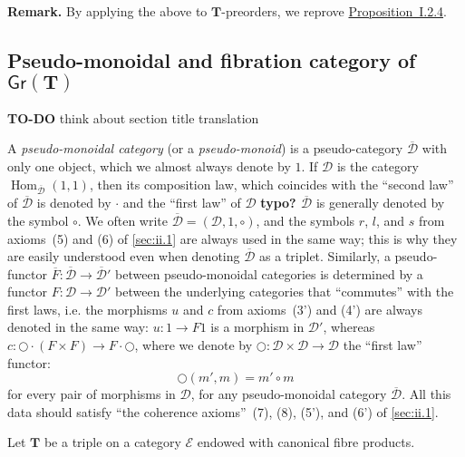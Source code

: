 \documentclass[fleqn]{article}
\newenvironment{rmenv}[1]
  {\phantomsection\par\medskip\noindent\textbf{#1.}\rmfamily}
  {\par\medskip}
\newcommand{\oldpage}[1]{\marginpar{\footnotesize$\Big\vert$ \textit{p.~#1}}}
\newcommand{\todo}{{\color{purple}\textbf{TO-DO }}}
\newcommand{\unsure}[1]{{\color{purple}\textbf{#1}}}
\newcommand{\TT}{\mathbf{T}}
\newcommand{\cat}[1]{\mathcal{#1}}
\newcommand{\Cat}[1]{\mathsf{#1}}
\newcommand{\Gr}[1]{\Cat{Gr}(#1)}
\DeclareMathOperator{\Hom}{Hom}
\begin{document}
\oldpage{262}

\begin{rmenv}{Remark}
  By applying the above to $\TT$-preorders, we reprove \hyperref[proposition:i.2.4]{Proposition~I.2.4}.
\end{rmenv}



\subsection{Pseudo-monoidal and fibration category of $\Gr{\TT}$}
\label{sec:ii.4}

\todo{think about section title translation}

A \emph{pseudo-monoidal category} (or a \emph{pseudo-monoid}) is a pseudo-category $\overline{\cat{D}}$ with only one object, which we almost always denote by $1$.
If $\cat{D}$ is the category $\Hom_{\overline{\cat{D}}}(1,1)$, then its composition law, which coincides with the ``second law'' of $\overline{\cat{D}}$ is denoted by $\cdot$ and the ``first law'' of $\cat{D}$ \unsure{typo? $\overline{\cat{D}}$} is generally denoted by the symbol $\circ$.
We often write $\overline{\cat{D}}=(\cat{D},1,\circ)$, and the symbols $r$, $l$, and $s$ from axioms~(5) and (6) of \cref{sec:ii.1} are always used in the same way;
this is why they are easily understood even when denoting $\overline{\cat{D}}$ as a triplet.
Similarly, a pseudo-functor $\overline{F}\colon\overline{\cat{D}}\to\overline{\cat{D}}'$ between pseudo-monoidal categories is determined by a functor $F\colon\cat{D}\to\cat{D}'$ between the underlying categories that ``commutes'' with the first laws, i.e. the morphisms $u$ and $c$ from axioms~(3') and (4') are always denoted in the same way: $u\colon1\to F1$ is a morphism in $\cat{D}'$, whereas $c\colon\bigcirc\cdot(F\times F)\to F\cdot\bigcirc$, where we denote by $\bigcirc\colon\cat{D}\times\cat{D}\to\cat{D}$ the ``first law'' functor:
\[
  \bigcirc(m',m)
  = m'\circ m
\]
for every pair of morphisms in $\cat{D}$, for any pseudo-monoidal category $\overline{\cat{D}}$.
All this data should satisfy ``the coherence axioms''~(7), (8), (5'), and (6') of \cref{sec:ii.1}.

Let $\TT$ be a triple on a category $\cat{E}$ endowed with canonical fibre products.






\nocite{*}
\printbibliography[heading=bibintoc,title=Bibliography]
\end{document}
